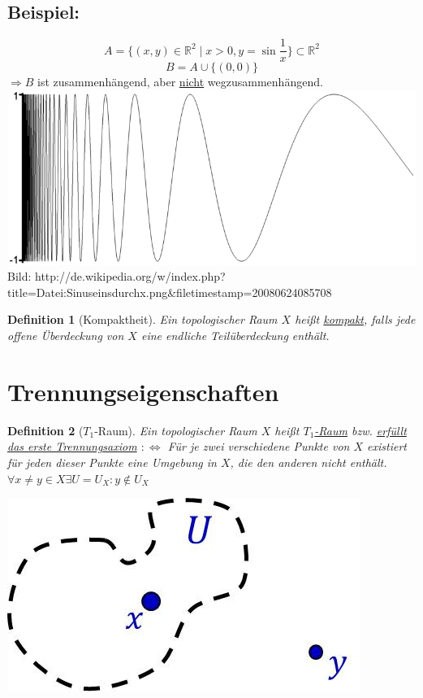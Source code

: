 \documentclass[a4paper,11pt,notitlepage]{report}
\newtheorem{definition}{Definition}[chapter]
\newcommand{\R}{{\ensuremath{\mathbb{R}}}}
\newenvironment{bsp}[1]
{
\setlength{\fboxsep}{10pt}
\subsection*{Beispiel: #1}
\begin{upshape}
}
{
\end{upshape}
}
\begin{document}
\begin{bsp}{}
	$$A=\{(x,y) \in \R^2 \mid x>0, y = \sin{\frac{1}{x}}\} \subset \R^2$$
	$$B=A \cup \{(0,0)\}$$
	$\Rightarrow B$ ist zusammenhängend, aber \underline{nicht} wegzusammenhängend.
	\newline
	\includegraphics[scale=0.4]{images/Sinuseinsdurchx.png}
	\newline
	\scriptsize{Bild: http://de.wikipedia.org/w/index.php?title=Datei:Sinuseinsdurchx.png\&filetimestamp=20080624085708}
\end{bsp}

\begin{definition}[Kompaktheit]
	Ein topologischer Raum $X$ heißt \underline{kompakt}, falls jede offene Überdeckung von $X$ eine endliche Teilüberdeckung enthält.
\end{definition}

\section{Trennungseigenschaften}
\begin{definition}[$T_1$-Raum]
Ein topologischer Raum $X$ heißt \underline{$T_1$-Raum} bzw. \underline{erfüllt das erste Trennungsaxiom} $:\Leftrightarrow$ Für je zwei verschiedene Punkte von $X$ existiert für jeden dieser Punkte eine Umgebung in $X$, die den anderen nicht enthält.
\newline
$\forall x \neq y \in X \exists U = U_X \colon y \notin U_X$ 
\end{definition}
\begin{center}
\includegraphics[scale=0.4]{images/T1.jpg}
\end{center}
\end{document}

